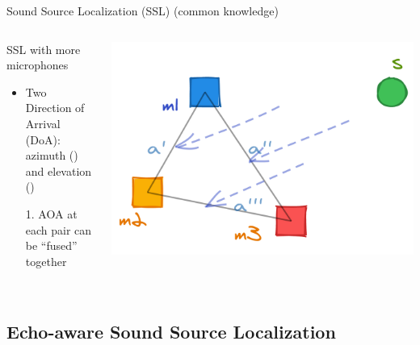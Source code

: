 \begin{frame}{Sound Source Localization (SSL) {\hfill\small (common knowledge)} \faBook}
    \begin{columns}[T,onlytextwidth]
        \begin{block}{SSL with more microphones}
            \begin{itemize}
                \item Two Direction of Arrival (DoA):
                \\azimuth (\faArrowsAltH) and elevation (\faArrowsAltV)
                \item[1.] AOA at each pair can be ``fused'' together
                \\
                \\
            \end{itemize}
        \end{block}
        \includegraphics[width=\textwidth]{figures/2d_ssl.png}
    \end{columns}


\end{frame}

\subsection{Echo-aware Sound Source Localization}

